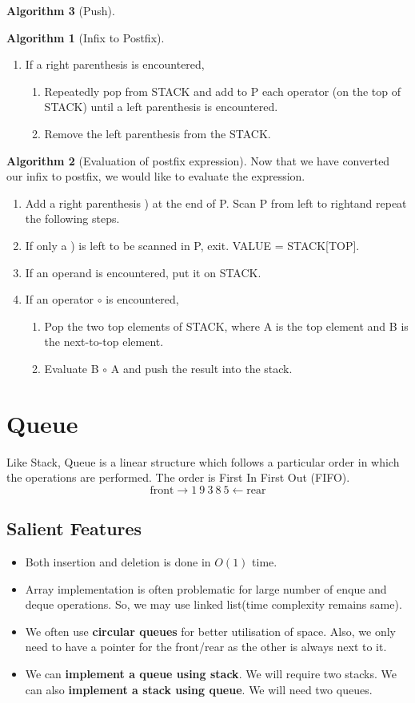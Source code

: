 \documentclass[10pt, a4paper]{extarticle}
\theoremstyle{definition}
\newtheorem{alg}{Algorithm}
\begin{document}
\begin{alg}[Push]
\begin{alg}[Infix to Postfix]
\begin{enumerate}
			\item If a right parenthesis is encountered,
				\begin{enumerate}
					\item Repeatedly pop from STACK and add to P each operator (on the top of STACK) until a left parenthesis is encountered.
					\item Remove the left parenthesis from the STACK.
			\end{enumerate}
	\end{enumerate}
	\end{alg}
	\begin{alg}[Evaluation of postfix expression]
		Now that we have converted our infix to postfix, we would like to evaluate the expression.
		\begin{enumerate}
			\item Add a right parenthesis ) at the end of P. Scan P from left to rightand repeat the following steps.
			\item If only a ) is left to be scanned in P, exit. VALUE = STACK[TOP].
			\item If an operand is encountered, put it on STACK.
			\item If an operator $\circ$ is encountered,
				\begin{enumerate}
					\item Pop the two top elements of STACK, where A is the top element and B is the next-to-top element.
					\item Evaluate B $\circ$ A and push the result into the stack.

			\end{enumerate}
	\end{enumerate}
	\end{alg}
	

	\section{Queue}
	Like Stack, Queue is a linear structure which follows a particular order in which the operations are performed. The order is First In First Out (FIFO).
	\[\boxed{\text{front}}\to1\ 9\ 3\ 8\ 5\leftarrow\boxed{\text{rear}}\]

	\subsection{Salient Features}
	\begin{itemize}
		\item Both insertion and deletion is done in $O(1)$ time.
		\item Array implementation is often problematic for large number of enque and deque operations. So, we may use linked list(time complexity remains same).
		\item We often use \textbf{circular queues} for better utilisation of space. Also, we only need to have a pointer for the front/rear as the other is always next to it.
		\item We can \textbf{implement a queue using stack}. We will require two stacks. We can also \textbf{implement a stack using queue}. We will need two queues.
	\end{itemize}

\end{alg}
\end{document}
